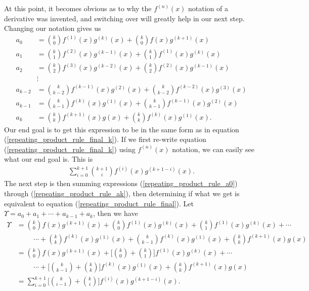 At this point, it becomes obvious as to why the $f^{(n)}(x)$ notation of a derivative was invented, and switching over will greatly help in our next step. Changing our notation gives us 
\begin{align}
	a_0&={{k}\choose{0}}f^{(1)}(x) g^{(k)}(x)+{{k}\choose{0}}f(x)g^{(k+1)}(x) \label{repeating_product_rule_a0}\\
	a_1&={{k}\choose{1}}f^{(2)}(x) g^{(k-1)}(x) +{{k}\choose{1}}f^{(1)}(x) g^{(k)}(x) \\
	a_2&={{k}\choose{2}}f^{(3)}(x) g^{(k-2)}(x) +{{k}\choose{2}}f^{(2)}(x) g^{(k-1)}(x) \\
	&\vdots \nonumber\\
	a_{k-2}&={{k}\choose{k-2}}f^{(k-1)}(x) g^{(2)}(x) +{{k}\choose{k-2}}f^{(k-2)}(x) g^{(3)}(x)\\
	a_{k-1}&={{k}\choose{k-1}}f^{(k)}(x) g^{(1)}(x)+{{k}\choose{k-1}}f^{(k-1)}(x) g^{(2)}(x)\\
	a_k&={{k}\choose{k}}f^{(k+1)}(x) g(x)+{{k}\choose{k}}f^{(k)}(x)g^{(1)}(x). \label{repeating_product_rule_ak}
\end{align}
Our end goal is to get this expression to be in the same form as in equation (\ref{repeating_product_rule_final_k}). If we first re-write equation (\ref{repeating_product_rule_final_k}) using $f^{(n)}(x)$ notation, we can easily see what our end goal is. This is
\begin{align}
	\sum_{i=0}^{k+1}{{k+1}\choose{i}}f^{(i)}(x) g^{(k+1-i)}(x) \label{repeating_product_rule_final}.
\end{align}
The next step is then summing expressions (\ref{repeating_product_rule_a0}) through (\ref{repeating_product_rule_ak}), then determining if what we get is equivalent to equation (\ref{repeating_product_rule_final}). Let $\Upsilon=a_0+a_1+\cdots+a_{k-1}+a_k$, then we have
\begin{align}
	\Upsilon&={{k}\choose{0}}f(x)g^{(k+1)}(x)+{{k}\choose{0}}f^{(1)}(x)g^{(k)}(x)+{{k}\choose{1}}f^{(1)}(x)g^{(k)}(x)+\cdots \nonumber\\
	&\hspace{1cm}\cdots+{{k}\choose{k}}f^{(k)}(x)g^{(1)}(x)+{{k}\choose{k-1}}f^{(k)}(x)g^{(1)}(x)+{{k}\choose{k}}f^{(k+1)}(x)g(x) \\
	&={{k}\choose{0}}f(x)g^{(k+1)}(x)+\bigg[{{k}\choose{0}}+{{k}\choose{1}} \bigg]f^{(1)}(x)g^{(k)}(x)+\cdots \nonumber\\
	&\hspace{1cm}\cdots+\bigg[{{k}\choose{k-1}}+{{k}\choose{k}} \bigg]f^{(k)}(x)g^{(1)}(x)+{{k}\choose{k}}f^{(k+1)}(x)g(x)\\
	&=\sum_{i=0}^{k+1}\bigg[{{k}\choose{i-1}}+{{k}\choose{i}} \bigg]f^{(i)}(x)g^{(k+1-i)}(x). \label{repeating_product_rule_00}
\end{align}
